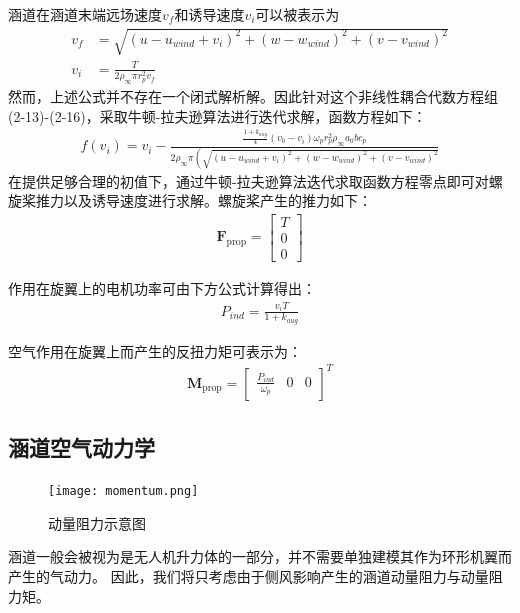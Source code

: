 涵道在涵道末端远场速度$v_{f}$和诱导速度$v_{i}$可以被表示为
\begin{align}
    v_{f}&=\sqrt{\left ( u-u_{wind}+v_{i}  \right )^{2}+\left (  w - w_{wind}\right ) ^{2}+\left ( v - v_{wind}\right )^{2}} \\
    v_{i}&=\frac{T}{2\rho _{\infty}\pi r_{p}^2v_{f}} 
\end{align}
然而，上述公式并不存在一个闭式解析解。因此针对这个非线性耦合代数方程组(2-13)-(2-16)，采取牛顿-拉夫逊算法进行迭代求解，函数方程如下：
\begin{align}
    f\left(v_{i}\right)=v_{i}-\frac{\frac{1+k_{aug}}{4} \left(v_{b}-v_{i}\right) \omega _{p}r_{p}^{2}\rho _{\infty}a_{0}bc_{p}}{2 \rho _{\infty} \pi\left(\sqrt{\left ( u-u_{wind}+v_{i}  \right )^{2}+\left (  w - w_{wind}\right ) ^{2}+\left ( v - v_{wind}\right )^{2}}\right.}
\end{align}
在提供足够合理的初值下，通过牛顿-拉夫逊算法迭代求取函数方程零点即可对螺旋桨推力以及诱导速度进行求解。螺旋桨产生的推力如下：
\begin{align}
    \mathbf{F}_{\text {prop}}=\left[\begin{array}{c}
        T \\
        0 \\
        0
        \end{array}\right]
\end{align}

作用在旋翼上的电机功率可由下方公式计算得出\cite{任小璐2014涵道式无人飞行器建模与控制方法研究}：
\begin{align}
    P_{ind}=\frac{v_{i} T}{1+k_{aug}}
\end{align}

空气作用在旋翼上而产生的反扭力矩可表示为：
\begin{align}
    \mathbf{M}_{\text {prop}}=\left[\begin{array}{lll}
        \frac{P_{ind}}{\omega_{p}} & 0 & 0
        \end{array}\right]^{T}
\end{align}

\subsection{涵道空气动力学}
\begin{figure}[htbp]
    \centering
    \texttt{[image: momentum.png]}
    \caption{\label{fig:momentum}动量阻力示意图}
\end{figure}
涵道一般会被视为是无人机升力体的一部分，并不需要单独建模其作为环形机翼而产生的气动力\cite{zhang2013new}。
因此，我们将只考虑由于侧风影响产生的涵道动量阻力与动量阻力矩。


